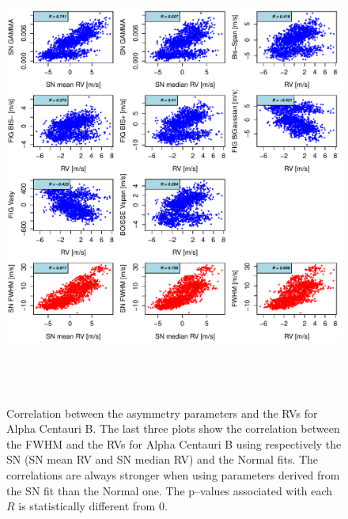 \documentclass{aa}
\begin{document}
\begin{figure}[htbp]
   \centering
\includegraphics[height = 6in]{HD12862_[4]Comparison_para.pdf}  
   \caption{Correlation between the asymmetry parameters and the RVs for Alpha Centauri B. The last three plots show the correlation between the FWHM and the RVs for Alpha Centauri B using respectively the SN (SN mean RV and SN median RV) and the Normal fits. The correlations are always stronger when using parameters derived from the SN fit than the Normal one. The p--values associated with each $R$ is statistically different from $0$.} 
   \label{fig:alphacent:corrPlot}
\end{figure}
%
\end{document}
